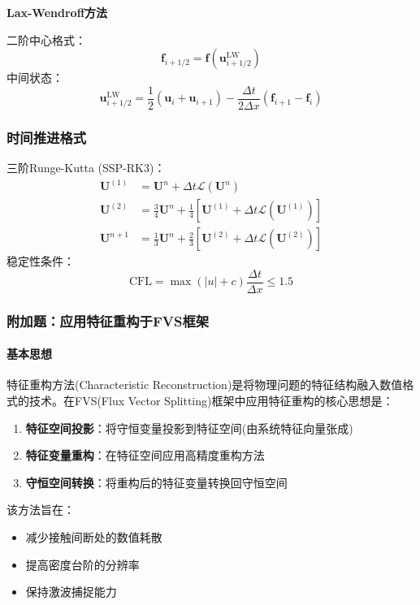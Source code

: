 \documentclass[UTF8]{ctexart}
\begin{document}
\textbf{Lax-Wendroff方法}

二阶中心格式：
\begin{equation}
\mathbf{f}_{i+1/2} = \mathbf{f}\left( \mathbf{u}_{i+1/2}^{\text{LW}} \right)
\end{equation}
中间状态：
\begin{equation}
\mathbf{u}_{i+1/2}^{\text{LW}} = \frac{1}{2} (\mathbf{u}_i + \mathbf{u}_{i+1}) - \frac{\Delta t}{2\Delta x} (\mathbf{f}_{i+1} - \mathbf{f}_i)
\end{equation}

\subsubsection{时间推进格式}
三阶Runge-Kutta (SSP-RK3)\cite{shu1988}：
\begin{align}
\mathbf{U}^{(1)} &= \mathbf{U}^n + \Delta t \mathcal{L}(\mathbf{U}^n) \\
\mathbf{U}^{(2)} &= \frac{3}{4}\mathbf{U}^n + \frac{1}{4}\left[ \mathbf{U}^{(1)} + \Delta t \mathcal{L}(\mathbf{U}^{(1)}) \right] \\
\mathbf{U}^{n+1} &= \frac{1}{3}\mathbf{U}^n + \frac{2}{3}\left[ \mathbf{U}^{(2)} + \Delta t \mathcal{L}(\mathbf{U}^{(2)}) \right]
\end{align}
稳定性条件：
\begin{equation}
\text{CFL} = \max \left( |u| + c \right) \frac{\Delta t}{\Delta x} \leq 1.5
\end{equation}

\subsubsection{附加题：应用特征重构于FVS框架}
\paragraph{基本思想}
特征重构方法(Characteristic Reconstruction)是将物理问题的特征结构融入数值格式的技术。在FVS(Flux Vector Splitting)框架中应用特征重构的核心思想是：
\begin{enumerate}
    \item \textbf{特征空间投影}：将守恒变量投影到特征空间(由系统特征向量张成)
    \item \textbf{特征变量重构}：在特征空间应用高精度重构方法
    \item \textbf{守恒空间转换}：将重构后的特征变量转换回守恒空间
\end{enumerate}

该方法旨在：
\begin{itemize}
    \item 减少接触间断处的数值耗散
    \item 提高密度台阶的分辨率
    \item 保持激波捕捉能力
\end{itemize}
\end{document}
